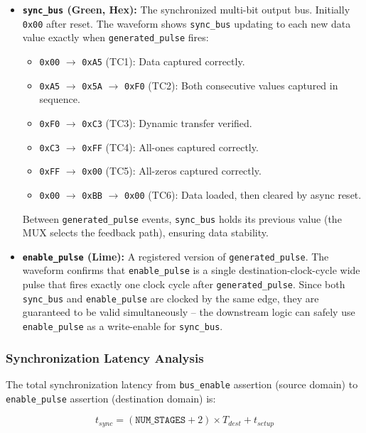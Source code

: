 \documentclass[12pt,a4paper]{article}
\begin{document}
\begin{itemize}
    \item \textbf{\texttt{sync\_bus} (Green, Hex):} The synchronized multi-bit output bus. Initially \texttt{0x00} after reset. The waveform shows \texttt{sync\_bus} updating to each new data value exactly when \texttt{generated\_pulse} fires:
    \begin{itemize}
        \item \texttt{0x00} $\to$ \texttt{0xA5} (TC1): Data captured correctly.
        \item \texttt{0xA5} $\to$ \texttt{0x5A} $\to$ \texttt{0xF0} (TC2): Both consecutive values captured in sequence.
        \item \texttt{0xF0} $\to$ \texttt{0xC3} (TC3): Dynamic transfer verified.
        \item \texttt{0xC3} $\to$ \texttt{0xFF} (TC4): All-ones captured correctly.
        \item \texttt{0xFF} $\to$ \texttt{0x00} (TC5): All-zeros captured correctly.
        \item \texttt{0x00} $\to$ \texttt{0xBB} $\to$ \texttt{0x00} (TC6): Data loaded, then cleared by async reset.
    \end{itemize}
    Between \texttt{generated\_pulse} events, \texttt{sync\_bus} holds its previous value (the MUX selects the feedback path), ensuring data stability.
    
    \item \textbf{\texttt{enable\_pulse} (Lime):} A registered version of \texttt{generated\_pulse}. The waveform confirms that \texttt{enable\_pulse} is a single destination-clock-cycle wide pulse that fires exactly one clock cycle after \texttt{generated\_pulse}. Since both \texttt{sync\_bus} and \texttt{enable\_pulse} are clocked by the same edge, they are guaranteed to be valid simultaneously -- the downstream logic can safely use \texttt{enable\_pulse} as a write-enable for \texttt{sync\_bus}.
\end{itemize}

\subsubsection{Synchronization Latency Analysis}

The total synchronization latency from \texttt{bus\_enable} assertion (source domain) to \texttt{enable\_pulse} assertion (destination domain) is:

\[
    t_{sync} = (\texttt{NUM\_STAGES} + 2) \times T_{dest} + t_{setup}
\]
\end{document}
